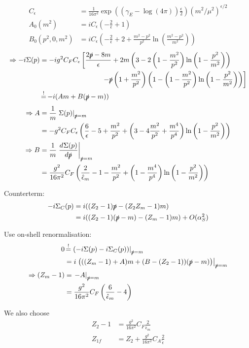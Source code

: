 \begin{align}
C_\epsilon &= \frac 1 {16\pi^2}\exp\left(\left(\gamma_E-\log(4\pi)\right)\frac{\epsilon} 2\right)\left(m^2/\mu^2\right)^{\epsilon/2}\\
A_0(m^2) &=iC_\epsilon\left(-\frac 2 {\epsilon}+1\right)\\
B_0(p^2,0,m^2) &=iC_\epsilon\left(-\frac 2{\epsilon}+2+\frac{m^2-p^2}{p^2}\ln\left(\frac{m^2-p^2}{m^2}\right)\right)
\end{align}
\begin{align}
\Rightarrow-i\Sigma(p) &= -ig^2C_FC_\epsilon\left[\frac{2\slashed{p}-8m}{\epsilon}+2m\left(3-2\left(1-\frac{m^2}{p^2}\right)\ln\left(1-\frac{p^2}{m^2}\right)\right)\right.\nonumber\\
 &\hspace{90pt}\left.-\slashed{p}\left(1+\frac{m^2}{p^2}\right)\left(1-\left(1-\frac{m^2}{p^2}\right)\ln\left(1-\frac{p^2}{m^2}\right)\right)\right]\\
 &\EqualClaim -i(A m + B(\slashed p - m))
\end{align}
\begin{align}
\Rightarrow A &= \frac 1 m \left.\Sigma(p)\right|_{\slashed{p}=m} \\
 &= -g^2C_F C_\epsilon\left(\frac 6 \epsilon -5 +\frac{m^2}{p^2}+\left(3-4\frac{m^2}{p^2}+\frac{m^4}{p^4}\right)\ln\left(1-\frac{p^2}{m^2}\right)\right)\\
\Rightarrow B &= \frac 1 m \left.\DeriveF{\slashed{p}}{\Sigma(p)}\right|_{\slashed{p}=m} \\
 &= \frac{g^2}{16\pi^2}C_F \left(\frac 2 {\hat\epsilon_m} -1-\frac{m^2}{p^2}+\left(1-\frac{m^4}{p^4}\right)\ln\left(1-\frac{p^2}{m^2}\right)\right)
\end{align}

Counterterm:
\begin{align}
-i\Sigma_C(p) &=i((Z_2-1)\slashed{p}-(Z_2 Z_m -1) m)\\
 &= i((Z_2-1)(\slashed p - m) - (Z_m-1)m) + O(\alpha_S^2)
\end{align}

Use on-shell renormalisation:
\begin{align}
0 &\EqualClaim \left.\left(-i\Sigma(p)-i\Sigma_C(p)\right)\right|_{\slashed{p}=m}\\
 &= i\left.\left(((Z_m-1)+A)m+(B-(Z_2-1))(\slashed p - m)\right)\right|_{\slashed{p}=m} \\
\Rightarrow (Z_m-1) &= \left.-A\right|_{\slashed{p}=m}\\
 &= \frac{g^2}{16\pi^2}C_F \left(\frac 6 {\hat \epsilon_m} -4\right)
\end{align}

We also choose
\begin{align}
Z_2-1 &= \frac{g^2}{16\pi^2}C_F \frac 2 {\hat \epsilon_m}\\
Z_{1f} &= Z_2 + \frac{g^2}{16\pi^2}C_A\frac 2 {\hat \epsilon}
\end{align}
